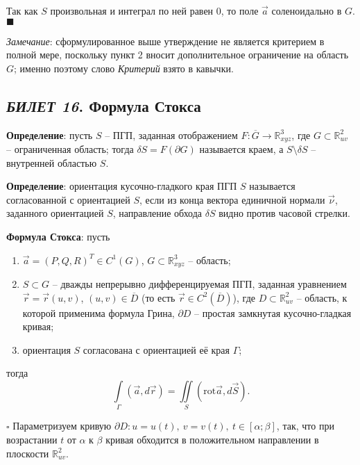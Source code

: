 \documentclass[12pt, a4paper, reqno]{article}
\begin{document}
    Так как $S$ произвольная и интеграл по ней равен 0, то поле $\vec{a}$ соленоидально в $G$.
    $\blacksquare$

    \textit{Замечание}: сформулированное выше утверждение не является критерием в полной мере,
    поскольку пункт 2 вносит дополнительное ограничение на область $G$; именно поэтому слово
    \textit{Критерий} взято в кавычки.

\newpage
\subsection{\textit{БИЛЕТ 16}. Формула Стокса}

    \textbf{Определение}: пусть $S$ -- ПГП, заданная отображением $F: \overline{G} \to \mathbb{R}_{xyz}^3$,
    где $G \subset \mathbb{R}_{uv}^2$ -- ограниченная область; тогда $\delta S = F(\partial G)$
    называется краем, а $S \setminus \delta S$ -- внутренней областью $S$.

    \textbf{Определение}: ориентация кусочно-гладкого края ПГП $S$ называется согласованной с
    ориентацией $S$, если из конца вектора единичной нормали $\vec{\nu}$, заданного ориентацией $S$,
    направление обхода $\delta S$ видно против часовой стрелки.

    \textbf{Формула Стокса}: пусть
    \begin{enumerate}
        \item $\vec{a} = (P, Q, R)^T \in C^1(G)$, $G \subset \mathbb{R}_{xyz}^3$ -- область;
        \item $S \subset G$ -- дважды непрерывно дифференцируемая ПГП, заданная уравнением
              $\vec{r} = \vec{r}(u, v)$, $(u, v) \in \overline{D}$ (то есть $\vec{r} \in C^2(\overline{D})$),
              где $D \subset \mathbb{R}_{uv}^2$ -- область, к которой применима формула Грина,
              $\partial D$ -- простая замкнутая кусочно-гладкая кривая;
        \item ориентация $S$ согласована с ориентацией её края $\Gamma$;
    \end{enumerate}
    тогда
    \begin{equation*}
        \int\limits_{\Gamma} (\vec{a}, d\vec{r}) = \iint\limits_{S} (\text{rot}\vec{a}, d\vec{S}).
    \end{equation*}

    $\square$
    Параметризуем кривую $\partial D: u = u(t),\ v = v(t),\ t \in [\alpha; \beta]$, так, что при
    возрастании $t$ от $\alpha$ к $\beta$ кривая обходится в положительном направлении в плоскости
    $\mathbb{R}_{uv}^2$.
\end{document}
